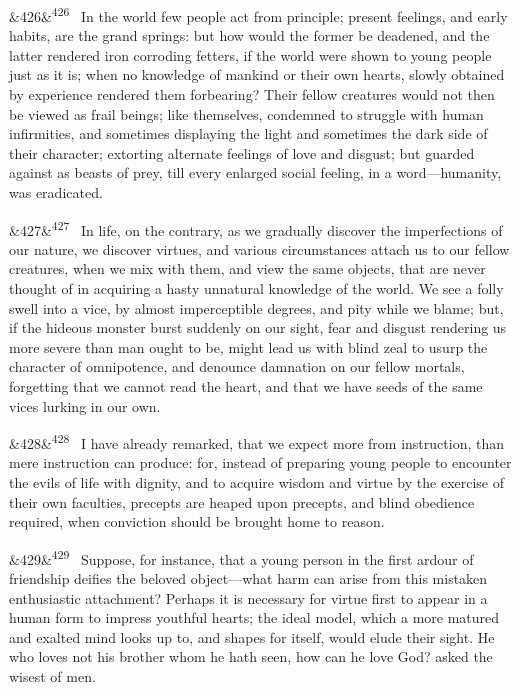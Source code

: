 \documentclass[12pt]{article}
\newcommand{\para}[1][]{\par\noindent\ifx&#1&\else\textsuperscript{\footnotesize #1}~\fi}
\begin{document}
\para[426] In the world few people act from principle; present feelings, and early habits, are the grand springs: but how would the former be deadened, and the latter rendered iron corroding fetters, if the world were shown to young people just as it is; when no knowledge of mankind or their own hearts, slowly obtained by experience rendered them forbearing? Their fellow creatures would not then be viewed as frail beings; like themselves, condemned to struggle with human infirmities, and sometimes displaying the light and sometimes the dark side of their character; extorting alternate feelings of love and disgust; but guarded against as beasts of prey, till every enlarged social feeling, in a word---humanity, was eradicated.

\para[427] In life, on the contrary, as we gradually discover the imperfections of our nature, we discover virtues, and various circumstances attach us to our fellow creatures, when we mix with them, and view the same objects, that are never thought of in acquiring a hasty unnatural knowledge of the world. We see a folly swell into a vice, by almost imperceptible degrees, and pity while we blame; but, if the hideous monster burst suddenly on our sight, fear and disgust rendering us more severe than man ought to be, might lead us with blind zeal to usurp the character of omnipotence, and denounce damnation on our fellow mortals, forgetting that we cannot read the heart, and that we have seeds of the same vices lurking in our own.

\para[428] I have already remarked, that we expect more from instruction, than mere instruction can produce: for, instead of preparing young people to encounter the evils of life with dignity, and to acquire wisdom and virtue by the exercise of their own faculties, precepts are heaped upon precepts, and blind obedience required, when conviction should be brought home to reason.

\para[429] Suppose, for instance, that a young person in the first ardour of friendship deifies the beloved object---what harm can arise from this mistaken enthusiastic attachment? Perhaps it is necessary for virtue first to appear in a human form to impress youthful hearts; the ideal model, which a more matured and exalted mind looks up to, and shapes for itself, would elude their sight. He who loves not his brother whom he hath seen, how can he love God? asked the wisest of men.
\end{document}
